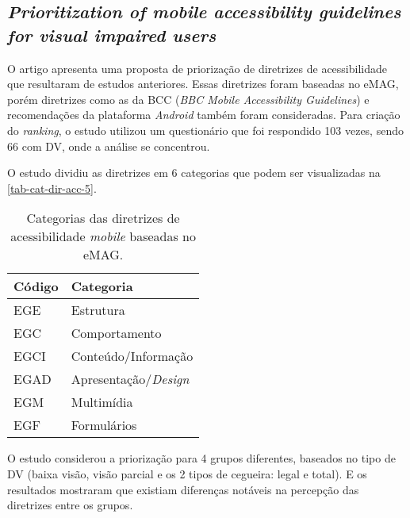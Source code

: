 \subsection{\emph{Prioritization of mobile accessibility guidelines for visual impaired users}}

O artigo apresenta uma proposta de priorização de diretrizes de acessibilidade que resultaram de estudos anteriores.
Essas diretrizes foram baseadas no eMAG, porém diretrizes como as da BCC (\emph{BBC Mobile Accessibility Guidelines}) e recomendações da plataforma \emph{Android} também foram consideradas.
Para criação do \emph{ranking}, o estudo utilizou um questionário que foi respondido 103 vezes, sendo 66 com DV, onde a análise se concentrou.

O estudo dividiu as diretrizes em 6 categorias que podem ser visualizadas na \autoref{tab-cat-dir-acc-5}.

\begin{table}[htb]
  \begin{center}
    \ABNTEXfontereduzida
    \caption{Categorias das diretrizes de acessibilidade \emph{mobile} baseadas no eMAG.}
    \label{tab-cat-dir-acc-5}
    \begin{tabular}{p{1.5cm}|p{4.5cm}}
      \textbf{Código} & \textbf{Categoria}         \\
      \hline
      EGE             & Estrutura                  \\
      \hline
      EGC             & Comportamento              \\
      \hline
      EGCI            & Conteúdo/Informação        \\
      \hline
      EGAD            & Apresentação/\emph{Design} \\
      \hline
      EGM             & Multimídia                 \\
      \hline
      EGF             & Formulários                \\
    \end{tabular}
  \end{center}
\end{table}

O estudo considerou a priorização para 4 grupos diferentes, baseados no tipo de DV (baixa visão, visão parcial e os 2 tipos de cegueira: legal e total).
E os resultados mostraram que existiam diferenças notáveis na percepção das diretrizes entre os grupos.

